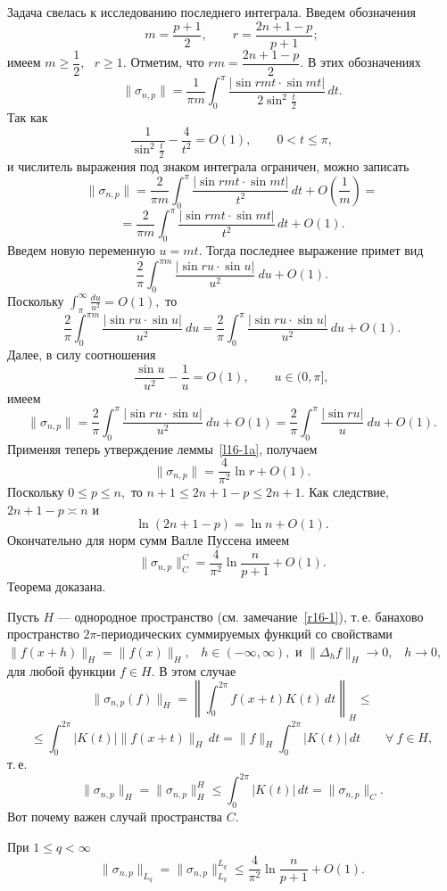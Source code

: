 Задача свелась к исследованию последнего интеграла. Введем обозначения
 $$
 m=\dfrac{p+1}{2},\qquad r=\dfrac{2n+1-p}{p+1};
 $$
 имеем $m\ge \dfrac{1}{2}$,~
$r\ge 1.$ Отметим, что $rm=\dfrac{2n+1-p}{2}.$
 В этих обозначениях
 $$
 \|\sigma_{n,p}\|=\frac{1}{\pi m}\int_0^{\pi}
\frac{ \left| \sin rmt\cdot \sin mt \right|}
 {2\sin^2\frac{t}{2}}\, dt.
 $$
 Так как
 $$
 \frac{1}{\sin^2 \frac{t}{2}}-\frac{4}{t^2}=O(1),\qquad 0<t\le\pi,
 $$
 и числитель выражения под знаком интеграла ограничен, можно записать
 $$
 \|\sigma_{n,p}\|=\frac{2}{\pi m}\int_0^{\pi}
 \frac{|\sin rmt\cdot \sin mt|}
 {t^2}\, dt+O\left( \frac{1}{m} \right)=
 $$
 $$
 =\frac{2}{\pi m}\int_0^{\pi}
 \frac{|\sin rmt\cdot \sin mt|}
 {t^2}\, dt+O(1).
 $$
 Введем новую переменную  $u=mt.$ Тогда последнее выражение примет вид
 $$
 \frac{2}{\pi}\int_0^{\pi m}
 \frac{|\sin ru\cdot \sin u|}
 {u^2}\ du+O(1).
 $$
 Поскольку  $\displaystyle\int_{\pi}^{\infty}\frac{du}{u^2}=O(1),$ то
  $$
 \frac{2}{\pi}\int_0^{\pi m}
 \frac{|\sin ru\cdot \sin u|}
 {u^2}\ du= \frac{2}{\pi}\int_0^{\pi}
 \frac{|\sin ru\cdot \sin u|}
 {u^2}\ du+O(1).
 $$
 Далее, в силу соотношения
 $$
 \frac{\sin u}{u^2}-\frac{1}{u}=O(1),\qquad u\in (0,\pi],$$
имеем
 $$
 \|\sigma_{n,p}\|=\frac{2}{\pi} \int_0^{\pi} \frac{|\sin ru \cdot \sin
 u|}{u^2}\ du+O(1)
 =\frac{2}{\pi} \int_0^{\pi} \frac{|\sin ru|}{u}\ du+O(1).
 $$
 Применяя теперь утверждение леммы~\ref{l16-1a}, получаем
  $$
 \|\sigma_{n,p}\|=
 \frac{4}{\pi^2} \ln r+O(1).
 $$
 Поскольку  $ 0\le p\le n,$ то  $n+1\le 2n+1-p\le 2n+1.$  Как следствие,  $2n+1-p \asymp n$ и
 $$
 \ln(2n+1-p)=\ln n+O(1).
 $$
Окончательно для норм сумм Валле Пуссена имеем
 $$
 \|\sigma_{n,p}\|_C^C=\frac{4}{\pi^2}\ln \frac{n}{p+1}+O(1).
 $$
 Теорема доказана.


 \begin{Remark} %
 Пусть $H$ --- однородное пространство (см. замечание~\ref{r16-1}), т.\,е.
 банахово пространство $2\pi$-периодических суммируемых функций со свойствами
 $\|f(x+h)\|_H=\|f(x)\|_H,$~ $h\in (-\infty,\infty),$ и $\|\Delta_h f\|_H\to 0,$~
 $h\to 0,$ для любой функции $f\in H.$
 В этом случае
 $$
 \|\sigma_{n,p}(f)\|_H=\left\| \int_0^{2\pi} f(x+t)K(t)\, dt
 \right\|_H\le
 $$
 $$
 \le \int_0^{2\pi} |K(t)| \|f(x+t)\|_H\, dt= \|f\|_H
 \int_0^{2\pi} |K(t)|\, dt \qquad \forall\ f\in H,
 $$
 т.\,е.
 $$
 \|\sigma_{n,p}\|_H=\|\sigma_{n,p}\|_H^H\le \int_0^{2\pi} |K(t)|\, dt=
 \|\sigma_{n,p}\|_C.
 $$
 Вот почему важен случай пространства  $C.$
 \end{Remark}

 \begin{Corollary} При $1\le q<\infty$
\begin{equation}\label{17-1}
 \|\sigma_{n,p}\|_{L_q}=\|\sigma_{n,p}\|_{L_q}^{L_q}\le
 \frac{4}{\pi^2}\ln \frac{n}{p+1}+O(1).
 \end{equation}
 \end{Corollary}

